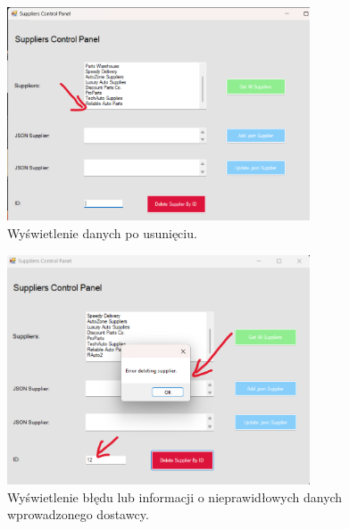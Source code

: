 \begin{figure}[h!]
    \centering
    \includegraphics[width=0.8\textwidth]{img_tests/suppliers_test_9.png}
    \caption{Wyświetlenie danych po usunięciu.}
    \label{fig:suppliers_test_9}
\end{figure}

\begin{figure}[h!]
    \centering
    \includegraphics[width=0.8\textwidth]{img_tests/suppliers_test_9_1.png}
    \caption{Wyświetlenie błędu lub informacji o nieprawidłowych danych wprowadzonego dostawcy.}
    \label{fig:suppliers_test_9_1}
\end{figure}


